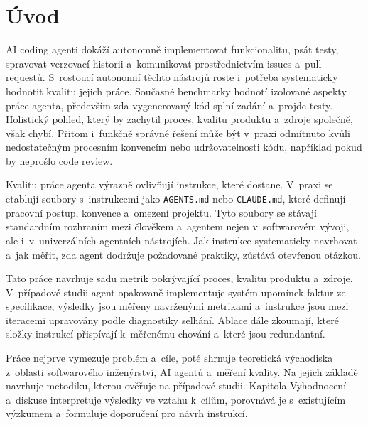 \chapter*{Úvod}

AI coding agenti dokáží autonomně implementovat funkcionalitu, psát
testy, spravovat verzovací historii a~komunikovat prostřednictvím
issues a~pull requestů. S~rostoucí autonomií těchto nástrojů roste
i~potřeba systematicky hodnotit kvalitu jejich práce. Současné
benchmarky hodnotí izolované aspekty práce agenta, především zda
vygenerovaný kód splní zadání a~projde testy. Holistický pohled,
který by zachytil proces, kvalitu produktu a~zdroje
společně, však chybí. Přitom i~funkčně správné řešení může být
v~praxi odmítnuto kvůli nedostatečným procesním konvencím nebo
udržovatelnosti kódu, například pokud by neprošlo code review.

Kvalitu práce agenta výrazně ovlivňují instrukce, které dostane.
V~praxi se etablují soubory s~instrukcemi jako \texttt{AGENTS.md}
nebo \texttt{CLAUDE.md}, které definují pracovní postup, konvence
a~omezení projektu. Tyto soubory se stávají standardním rozhraním
mezi člověkem a~agentem nejen v~softwarovém vývoji, ale
i~v~univerzálních agentních nástrojích. Jak instrukce systematicky
navrhovat a~jak měřit, zda agent dodržuje požadované praktiky,
zůstává otevřenou otázkou.

Tato práce navrhuje sadu metrik pokrývající proces, kvalitu produktu
a~zdroje. V~případové
studii agent opakovaně implementuje systém upomínek faktur ze
specifikace, výsledky jsou měřeny navrženými metrikami a~instrukce
jsou mezi iteracemi upravovány podle diagnostiky selhání. Ablace dále
zkoumají, které složky instrukcí přispívají k~měřenému chování
a~které jsou redundantní.

Práce nejprve vymezuje problém a~cíle, poté shrnuje teoretická
východiska z~oblasti softwarového inženýrství, AI agentů
a~měření kvality. Na jejich základě navrhuje metodiku, kterou
ověřuje na případové studii. Kapitola Vyhodnocení a~diskuse interpretuje
výsledky ve vztahu k~cílům, porovnává je s~existujícím výzkumem
a~formuluje doporučení pro návrh instrukcí.
